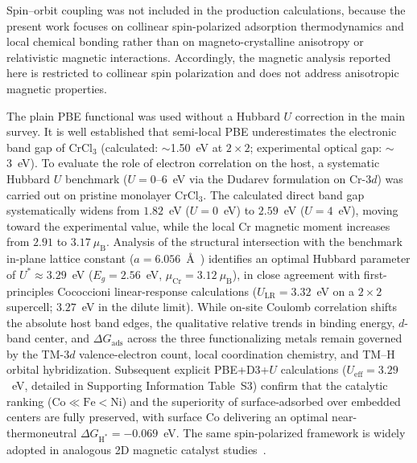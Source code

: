 \documentclass[journal=jacsat,manuscript=article]{achemso}
\begin{document}
{\color{revcolor}%
  Spin--orbit coupling was not included in the production calculations, because the present work focuses on collinear spin-polarized adsorption thermodynamics and local chemical bonding rather than on magneto-crystalline anisotropy or relativistic magnetic interactions. Accordingly, the magnetic analysis reported here is restricted to collinear spin polarization and does not address anisotropic magnetic
  properties.
\par}

{\color{revcolor}%
  The plain PBE functional was used without a Hubbard $U$ correction in the main survey. It is well established that semi-local PBE underestimates the electronic band gap of CrCl$_3$ (calculated: $\sim$1.50~eV at $2\times 2$; experimental optical gap: $\sim$3~eV). To evaluate the role of electron correlation on the host, a systematic Hubbard $U$ benchmark ($U = 0\text{--}6$~eV via the Dudarev formulation on Cr-$3d$) was carried out on pristine monolayer CrCl$_3$. The calculated direct band gap systematically widens from $1.82$~eV ($U=0$~eV) to $2.59$~eV ($U=4$~eV), moving toward the experimental value, while the local Cr magnetic moment increases from $2.91$ to $3.17~\mu_{\mathrm{B}}$. Analysis of the structural intersection with the benchmark in-plane lattice constant ($a = 6.056$~\AA~\cite{Webster2018}) identifies an optimal Hubbard parameter of $U^* \approx 3.29$~eV ($E_g = 2.56$~eV, $\mu_{\mathrm{Cr}} = 3.12~\mu_{\mathrm{B}}$), in close agreement with first-principles Cococcioni linear-response calculations ($U_{\text{LR}} = 3.32$~eV on a $2\times 2$ supercell; $3.27$~eV in the dilute limit). While on-site Coulomb correlation shifts the absolute host band edges, the qualitative relative trends in binding energy, $d$-band center, and $\Delta G_{\mathrm{ads}}$ across the three functionalizing metals remain governed by the TM-$3d$ valence-electron count, local coordination chemistry, and TM--H orbital hybridization. Subsequent explicit PBE+D3+$U$ calculations ($U_{\text{eff}} = 3.29$~eV, detailed in Supporting Information Table~S3) confirm that the catalytic ranking ($\text{Co} \ll \text{Fe} < \text{Ni}$) and the superiority of surface-adsorbed over embedded centers are fully preserved, with surface Co delivering an optimal near-thermoneutral $\Delta G_{\mathrm{H}^*} = -0.069$~eV. The same spin-polarized framework is widely adopted in analogous 2D magnetic catalyst studies~\cite{Zala2024,Ipaves2025,Liao2022}.
\par}
\end{document}
